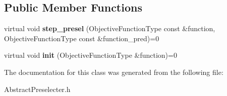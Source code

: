 \subsection*{Public Member Functions}
\begin{DoxyCompactItemize}
\item 
virtual void {\bfseries step\+\_\+presel} (Objective\+Function\+Type const \&function, Objective\+Function\+Type const \&function\+\_\+pred)=0\hypertarget{classAbstractPreselecter_ac7bd0dac8d7eaf85319524ee6d80f52d}{}\label{classAbstractPreselecter_ac7bd0dac8d7eaf85319524ee6d80f52d}

\item 
virtual void {\bfseries init} (Objective\+Function\+Type \&function)=0\hypertarget{classAbstractPreselecter_ac9283e597dc5d633b1f7ce959881dbb8}{}\label{classAbstractPreselecter_ac9283e597dc5d633b1f7ce959881dbb8}

\end{DoxyCompactItemize}


The documentation for this class was generated from the following file\+:\begin{DoxyCompactItemize}
\item 
Abstract\+Preselecter.\+h\end{DoxyCompactItemize}
